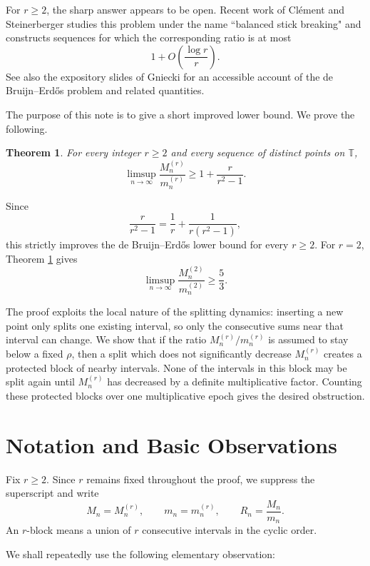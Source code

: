 \documentclass[11pt]{article}
\newtheorem{theorem}{Theorem}[section]
\theoremstyle{remark}
\begin{document}
\bigskip
\noindent
For $r\geq 2$, the sharp answer appears to be open. Recent work of Cl\'ement and Steinerberger \cite{clement-steinerberger} studies this problem under the name ``balanced stick breaking" and constructs sequences for which the corresponding ratio is at most
\[
    1+O\left(\frac{\log r}{r}\right).
\]
See also the expository slides of Gniecki \cite{gniecki-slides} for an accessible account of the de Bruijn--Erd\H{o}s problem and related quantities.

\bigskip
\noindent
The purpose of this note is to give a short improved lower bound. We prove the following.

\begin{theorem}\label{thm:main}
For every integer $r\geq 2$ and every sequence of distinct points on $\mathbb T$,
\[
    \limsup_{n\to\infty}
    \frac{M_n^{(r)}}{m_n^{(r)}}
    \geq
    1+\frac{r}{r^2-1}.
\]
\end{theorem}

\smallskip
\noindent
Since
\[
    \frac{r}{r^2-1}
    =
    \frac1r+\frac1{r(r^2-1)},
\]
this strictly improves the de Bruijn--Erd\H{o}s lower bound for every $r\geq 2$. For $r=2$, Theorem \ref{thm:main} gives
\[
    \limsup_{n\to\infty}\frac{M_n^{(2)}}{m_n^{(2)}}
    \geq
    \frac53 .
\]

\smallskip
\noindent
The proof exploits the local nature of the splitting dynamics: inserting a new point only splits one existing interval, so only the consecutive sums near that interval can change. We show that if the ratio $M_n^{(r)}/m_n^{(r)}$ is assumed to stay below a fixed $\rho$, then a split which does not significantly decrease $M_n^{(r)}$ creates a protected block of nearby intervals. None of the intervals in this block may be split again until $M_n^{(r)}$ has decreased by a definite multiplicative factor. Counting these protected blocks over one multiplicative epoch gives the desired obstruction.

\section{Notation and Basic Observations}

Fix $r\geq 2$. Since $r$ remains fixed throughout the proof, we suppress the superscript and write
\[
    M_n=M_n^{(r)},\qquad m_n=m_n^{(r)},\qquad R_n=\frac{M_n}{m_n}.
\]
An $r$-block means a union of $r$ consecutive intervals in the cyclic order.

\bigskip
\noindent
We shall repeatedly use the following elementary observation:
\end{document}
